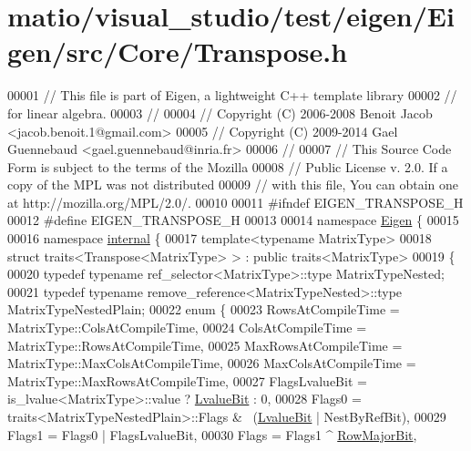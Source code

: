\hypertarget{matio_2visual__studio_2test_2eigen_2_eigen_2src_2_core_2_transpose_8h_source}{}\section{matio/visual\+\_\+studio/test/eigen/\+Eigen/src/\+Core/\+Transpose.h}
\label{matio_2visual__studio_2test_2eigen_2_eigen_2src_2_core_2_transpose_8h_source}

\begin{DoxyCode}
00001 \textcolor{comment}{// This file is part of Eigen, a lightweight C++ template library}
00002 \textcolor{comment}{// for linear algebra.}
00003 \textcolor{comment}{//}
00004 \textcolor{comment}{// Copyright (C) 2006-2008 Benoit Jacob <jacob.benoit.1@gmail.com>}
00005 \textcolor{comment}{// Copyright (C) 2009-2014 Gael Guennebaud <gael.guennebaud@inria.fr>}
00006 \textcolor{comment}{//}
00007 \textcolor{comment}{// This Source Code Form is subject to the terms of the Mozilla}
00008 \textcolor{comment}{// Public License v. 2.0. If a copy of the MPL was not distributed}
00009 \textcolor{comment}{// with this file, You can obtain one at http://mozilla.org/MPL/2.0/.}
00010 
00011 \textcolor{preprocessor}{#ifndef EIGEN\_TRANSPOSE\_H}
00012 \textcolor{preprocessor}{#define EIGEN\_TRANSPOSE\_H}
00013 
00014 \textcolor{keyword}{namespace }\hyperlink{namespace_eigen}{Eigen} \{ 
00015 
00016 \textcolor{keyword}{namespace }\hyperlink{namespaceinternal}{internal} \{
00017 \textcolor{keyword}{template}<\textcolor{keyword}{typename} MatrixType>
00018 \textcolor{keyword}{struct }traits<Transpose<MatrixType> > : \textcolor{keyword}{public} traits<MatrixType>
00019 \{
00020   \textcolor{keyword}{typedef} \textcolor{keyword}{typename} ref\_selector<MatrixType>::type MatrixTypeNested;
00021   \textcolor{keyword}{typedef} \textcolor{keyword}{typename} remove\_reference<MatrixTypeNested>::type MatrixTypeNestedPlain;
00022   \textcolor{keyword}{enum} \{
00023     RowsAtCompileTime = MatrixType::ColsAtCompileTime,
00024     ColsAtCompileTime = MatrixType::RowsAtCompileTime,
00025     MaxRowsAtCompileTime = MatrixType::MaxColsAtCompileTime,
00026     MaxColsAtCompileTime = MatrixType::MaxRowsAtCompileTime,
00027     FlagsLvalueBit = is\_lvalue<MatrixType>::value ? \hyperlink{group__flags_gae2c323957f20dfdc6cb8f44428eaec1a}{LvalueBit} : 0,
00028     Flags0 = traits<MatrixTypeNestedPlain>::Flags & ~(\hyperlink{group__flags_gae2c323957f20dfdc6cb8f44428eaec1a}{LvalueBit} | NestByRefBit),
00029     Flags1 = Flags0 | FlagsLvalueBit,
00030     Flags = Flags1 ^ \hyperlink{group__flags_gae4f56c2a60bbe4bd2e44c5b19cbe8762}{RowMajorBit},

\end{DoxyCode}
